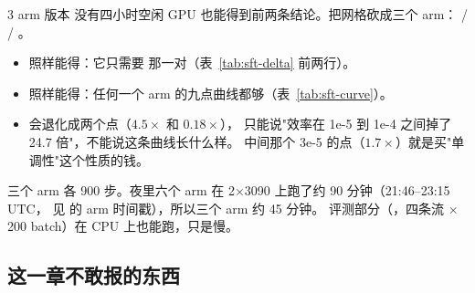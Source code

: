 \begin{tipbox}{3 arm 版本}
没有四小时空闲 GPU 也能得到前两条结论。把网格砍成三个 arm：
 /  / 。

\begin{itemize}[leftmargin=1.5em, topsep=2pt]
  \item {}照样能得：它只需要  那一对（表~\ref{tab:sft-delta} 前两行）。
  \item {}照样能得：任何一个 arm 的九点曲线都够（表~\ref{tab:sft-curve}）。
  \item {}会退化成两个点（$4.5\times$ 和 $0.18\times$），
        只能说"效率在 1e-5 到 1e-4 之间掉了 24.7 倍"，不能说这条曲线长什么样。
        中间那个 3e-5 的点（$1.7\times$）就是买"单调性"这个性质的钱。
\end{itemize}
\resources 三个 arm 各 900 步。夜里六个 arm 在 2$\times$3090 上跑了约 90 分钟（21:46--23:15 UTC，
见  的 arm 时间戳），所以三个 arm 约 45 分钟。
评测部分（，四条流 $\times$ 200 batch）在 CPU 上也能跑，只是慢。
\end{tipbox}

\subsection{这一章不敢报的东西}
\label{sec:b-sft-honest}

